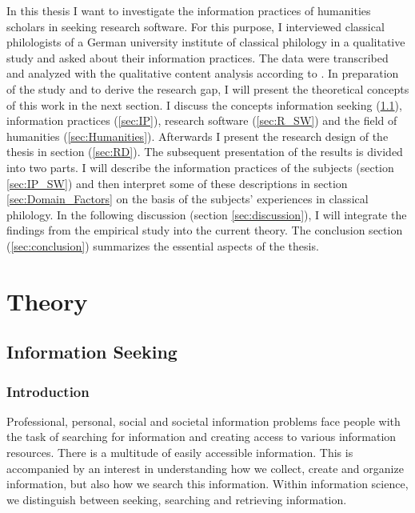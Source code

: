 \documentclass[12pt, a4paper, titlepage, oneside, abstract=true, toc=listof, toc=bibliography]{scrreprt}
\begin{document}
In this thesis I want to investigate the information practices of humanities scholars in seeking research software. For this purpose, I interviewed classical philologists of a German university institute of classical philology in a qualitative study and asked about their information practices. The data were transcribed and analyzed with the qualitative content analysis according to \citet{Mayring2014}. In preparation of the study and to derive the research gap, I will present the theoretical concepts of this work in the next section. I discuss the concepts information seeking (\ref{sec:IS}), information practices (\ref{sec:IP}), research software (\ref{sec:R_SW}) and the field of humanities (\ref{sec:Humanities}). Afterwards I present the research design of the thesis in section (\ref{sec:RD}). The subsequent presentation of the results is divided into two parts. I will describe the information practices of the subjects (section \ref{sec:IP_SW}) and then interpret some of these descriptions in section \ref{sec:Domain_Factors} on the basis of the subjects' experiences in classical philology. In the following discussion (section \ref{sec:discussion}), I will integrate the findings from the empirical study into the current theory. The conclusion section (\ref{sec:conclusion}) summarizes the essential aspects of the thesis.

\chapter{Theory}

\section{Information Seeking}
\label{sec:IS}

\subsection{Introduction}
Professional, personal, social and societal information problems face people with the task of searching for information and creating access to various information resources. There is a multitude of easily accessible information. This is accompanied by an interest in understanding how we collect, create and organize information, but also how we search this information. Within information science, we distinguish between seeking, searching and retrieving information. 
\end{document}
